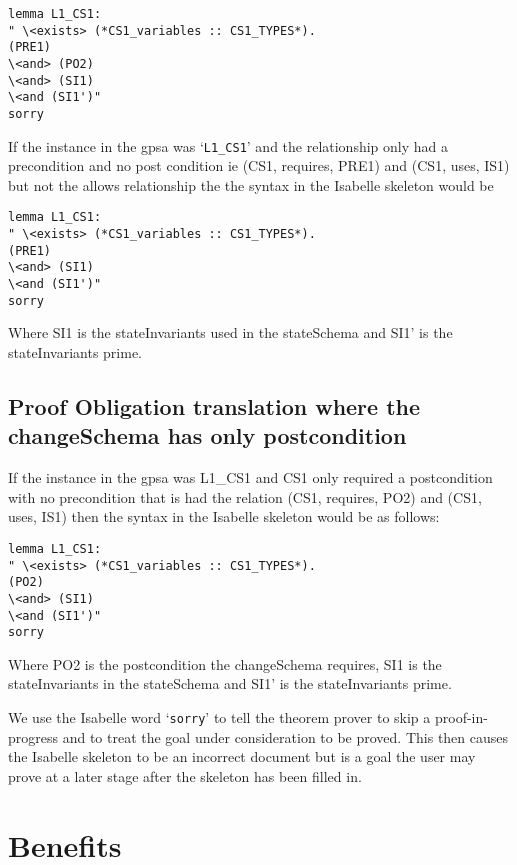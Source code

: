 \begin{verbatim}
lemma L1_CS1:
" \<exists> (*CS1_variables :: CS1_TYPES*).
(PRE1)
\<and> (PO2)
\<and> (SI1)
\<and (SI1')"
sorry
\end{verbatim}

If the instance in the \gls{gpsa} was `\texttt{L1\_CS1}' and the relationship only had a precondition and no post condition ie (CS1, requires, PRE1) and (CS1, uses, IS1) but not the allows relationship the the syntax in the Isabelle skeleton would be 

\begin{verbatim}
lemma L1_CS1:
" \<exists> (*CS1_variables :: CS1_TYPES*).
(PRE1)
\<and> (SI1)
\<and (SI1')"
sorry
\end{verbatim}

Where SI1 is the stateInvariants used in the stateSchema and SI1' is the stateInvariants prime.

\subsection{Proof Obligation translation where the changeSchema has only postcondition}

If the instance in the \gls{gpsa} was L1\_CS1 and CS1 only required a postcondition with no precondition that is had the relation (CS1, requires, PO2) and (CS1, uses, IS1) then the syntax in the Isabelle skeleton would be as follows:

\begin{verbatim}
lemma L1_CS1:
" \<exists> (*CS1_variables :: CS1_TYPES*).
(PO2)
\<and> (SI1)
\<and (SI1')"
sorry
\end{verbatim}

Where PO2 is the postcondition the changeSchema requires, SI1 is the stateInvariants in the stateSchema and SI1' is the stateInvariants prime. 

We use the Isabelle word `\texttt{sorry}' to tell the theorem prover to skip a proof-in-progress and to treat the goal under consideration to be proved. This then causes the Isabelle skeleton to be an incorrect document but is a goal the user may prove at a later stage after the skeleton has been filled in.

\section{Benefits}


